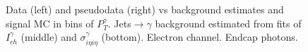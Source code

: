 \begin{figure}[htb]
\begin{center}
  \caption{Data (left) and pseudodata (right) vs background estimates and signal MC in bins of $P_T^{\gamma}$. Jets$\rightarrow\gamma$ background estimated from fits of $I_{ch}^{\gamma}$ (middle) and  $\sigma_{i\eta i\eta}^{\gamma}$ (bottom). Electron channel. Endcap photons.}
  \label{fig:DATAvsBKGandSIGMC_MCclosure_ELECTRON_E}
  \end{center}
\end{figure}

